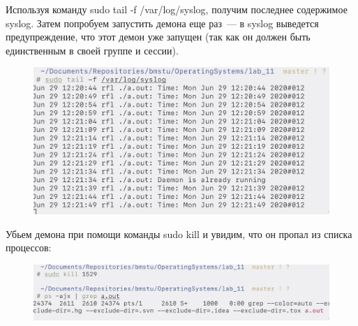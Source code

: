 Используя команду sudo tail -f /var/log/syslog, получим последнее содержимое syslog. Затем попробуем запустить демона еще раз~--- в syslog выведется предупреждение, что этот демон уже запущен (так как он должен быть единственным в своей группе и сессии).

\begin{figure}[H]
    \centering
    \caption{}
    \includegraphics[scale=.4]{images/scr_03.png}
\end{figure}

Убьем демона при помощи команды sudo kill и увидим, что он пропал из списка процессов:

\begin{figure}[H]
    \centering
    \caption{}
    \includegraphics[scale=.4]{images/scr_04.png}
\end{figure}

